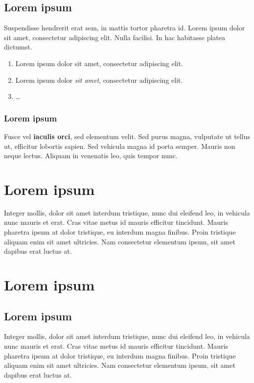 \subsection{Lorem ipsum}

Suspendisse hendrerit erat sem, in mattis tortor pharetra id. Lorem ipsum dolor sit amet, consectetur adipiscing elit. Nulla facilisi. In hac habitasse platea dictumst.
\begin{enumerate}
\item Lorem ipsum dolor sit amet, consectetur adipiscing elit.
\item Lorem ipsum dolor \textit{sit amet}, consectetur adipiscing elit.
\item \ldots
\end{enumerate}

\subsubsection{Lorem ipsum}

Fusce vel \textbf{iaculis orci}, sed elementum velit. Sed purus magna, vulputate ut tellus ut, efficitur lobortis sapien. Sed vehicula magna id porta semper. Mauris non neque lectus. Aliquam in venenatis leo, quis tempor nunc.

\section{Lorem ipsum}

Integer mollis, dolor sit amet interdum tristique, nunc dui eleifend leo, in vehicula nunc mauris et erat. Cras vitae metus id mauris efficitur tincidunt. Mauris pharetra ipsum at dolor tristique, eu interdum magna finibus. Proin tristique aliquam enim sit amet ultricies. Nam consectetur elementum ipsum, sit amet dapibus erat luctus at.

\section{Lorem ipsum}

\subsection{Lorem ipsum}

Integer mollis, dolor sit amet interdum tristique, nunc dui eleifend leo, in vehicula nunc mauris et erat. Cras vitae metus id mauris efficitur tincidunt. Mauris pharetra ipsum at dolor tristique, eu interdum magna finibus. Proin tristique aliquam enim sit amet ultricies. Nam consectetur elementum ipsum, sit amet dapibus erat luctus at.

